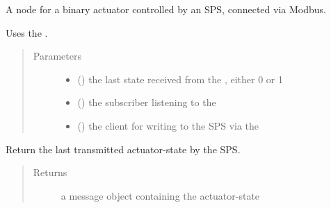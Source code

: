 \documentclass[a4paper,12pt,english]{article}
\begin{document}
\begin{fulllineitems}
\label{\detokenize{meso_control_pkg:meso_control_pkg.sps_binary_actuator_node.SpsBinaryActuator}}
A node for a binary actuator controlled by an SPS, connected via Modbus.

Uses the .
\begin{quote}\begin{description}
\item[{Parameters}] \leavevmode\begin{itemize}
\item {} 
 () \textendash{} the last state received from the , either 0 or 1

\item {} 
 () \textendash{} the subscriber listening to the 

\item {} 
 () \textendash{} the client for writing to the SPS via the 

\end{itemize}

\end{description}\end{quote}

\begin{fulllineitems}
\label{\detokenize{meso_control_pkg:meso_control_pkg.sps_binary_actuator_node.SpsBinaryActuator.poll_status}}
Return the last transmitted actuator-state by the SPS.
\begin{quote}\begin{description}
\item[{Returns}] \leavevmode
a message object containing the actuator-state


\end{description}
\end{quote}
\end{fulllineitems}
\end{fulllineitems}
\end{document}
